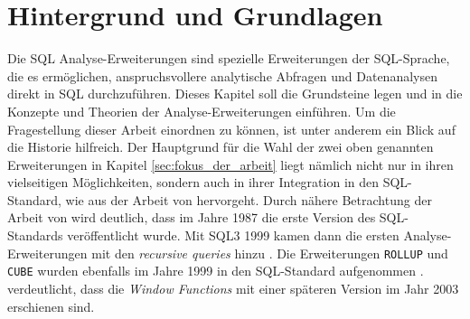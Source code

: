 \chapter{Hintergrund und Grundlagen}
\label{chap:hintergund_und_grundlagen} Die SQL Analyse-Erweiterungen sind spezielle
Erweiterungen der SQL-Sprache, die es ermöglichen, anspruchsvollere analytische Abfragen
und Datenanalysen direkt in SQL durchzuführen. Dieses Kapitel soll die
Grundsteine legen und in die Konzepte und Theorien der Analyse-Erweiterungen
einführen. Um die Fragestellung dieser Arbeit einordnen zu können, ist unter
anderem ein Blick auf die Historie hilfreich. Der Hauptgrund für die Wahl der zwei
oben genannten Erweiterungen in Kapitel \ref{sec:fokus_der_arbeit} liegt nämlich
nicht nur in ihren vielseitigen Möglichkeiten, sondern auch in ihrer Integration
in den SQL-Standard, wie aus der Arbeit von \citet[S.~10]{grust2017advanced}
hervorgeht. Durch nähere Betrachtung der Arbeit von \cite{grust2017advanced} wird
deutlich, dass im Jahre 1987 die erste Version des SQL-Standards veröffentlicht
wurde. Mit SQL3 1999 kamen dann die ersten Analyse-Erweiterungen mit den \textit{recursive
queries} hinzu \citep[S.~10]{grust2017advanced}. Die Erweiterungen \texttt{ROLLUP}
und \texttt{CUBE} wurden ebenfalls im Jahre 1999 in den SQL-Standard aufgenommen
\citep[Kapitel 9.12]{melton2001sql}. \citet[S.~10]{grust2017advanced}
verdeutlicht, dass die \textit{Window Functions} mit einer späteren Version im
Jahr 2003 erschienen sind.


